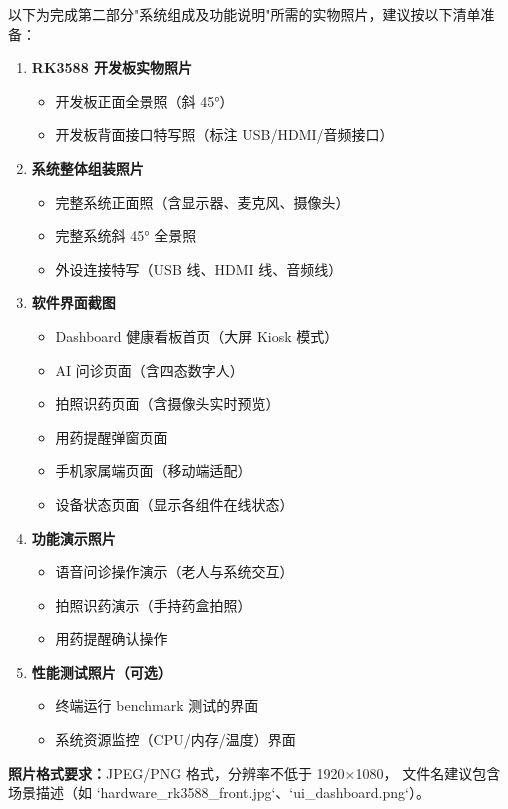 \documentclass[12pt, a4paper]{ctexart}
\begin{document}
以下为完成第二部分"系统组成及功能说明"所需的实物照片，建议按以下清单准备：

\begin{enumerate}[leftmargin=2em, itemsep=4pt]

  \item \textbf{RK3588 开发板实物照片}
    \begin{itemize}[leftmargin=1.5em]
      \item 开发板正面全景照（斜 45°）
      \item 开发板背面接口特写照（标注 USB/HDMI/音频接口）
    \end{itemize}

  \item \textbf{系统整体组装照片}
    \begin{itemize}[leftmargin=1.5em]
      \item 完整系统正面照（含显示器、麦克风、摄像头）
      \item 完整系统斜 45° 全景照
      \item 外设连接特写（USB 线、HDMI 线、音频线）
    \end{itemize}

  \item \textbf{软件界面截图}
    \begin{itemize}[leftmargin=1.5em]
      \item Dashboard 健康看板首页（大屏 Kiosk 模式）
      \item AI 问诊页面（含四态数字人）
      \item 拍照识药页面（含摄像头实时预览）
      \item 用药提醒弹窗页面
      \item 手机家属端页面（移动端适配）
      \item 设备状态页面（显示各组件在线状态）
    \end{itemize}

  \item \textbf{功能演示照片}
    \begin{itemize}[leftmargin=1.5em]
      \item 语音问诊操作演示（老人与系统交互）
      \item 拍照识药演示（手持药盒拍照）
      \item 用药提醒确认操作
    \end{itemize}

  \item \textbf{性能测试照片（可选）}
    \begin{itemize}[leftmargin=1.5em]
      \item 终端运行 benchmark 测试的界面
      \item 系统资源监控（CPU/内存/温度）界面
    \end{itemize}

\end{enumerate}

\noindent\textbf{照片格式要求：}JPEG/PNG 格式，分辨率不低于 1920×1080，
文件名建议包含场景描述（如 `hardware_rk3588_front.jpg`、`ui_dashboard.png`）。
\end{document}
